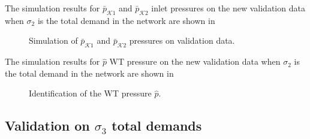  \vspace{-3mm}

The simulation results for $\bar{p}_{\mathcal{K}1}$ and $\bar{p}_{\mathcal{K}2}$ inlet pressures on the new validation data when $\sigma_2$ is the total demand in the network are shown in 

\vspace{-2mm}

 \begin{figure}[H]
 \centering
  
 \vspace{-2.5mm}
 \caption{Simulation of $\bar{p}_{\mathcal{K}1}$ and $\bar{p}_{\mathcal{K}2}$ pressures on validation data.}
 \label{fig:pk1_sigma2}
 \end{figure}

 \vspace{-4mm}

 The simulation results for $\hat{p}$ WT pressure on the new validation data when $\sigma_2$ is the total demand in the network are shown in 

 \begin{figure}[H]
 \centering
  
 \vspace{-2.5mm}
 \caption{Identification of the WT pressure $\hat{p}$.}
 \label{fig:WT_ident_sigma2}
 \end{figure}

 \vspace{-4mm}


\subsection{Validation on $\sigma_3$ total demands}
 \label{validation_sigma2}


\vspace{-2mm}

 \begin{figure}[H]
 \centering
  
 \vspace{-2.5mm}
 \label{fig:dk_sigma3}
 \end{figure}

